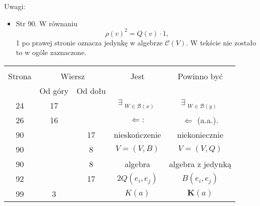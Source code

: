 Uwagi:
\begin{itemize}
\item Str 90. W równaniu
  \begin{displaymath}
    \rho( v )^{ 2 } = Q( v ) \cdot 1,
  \end{displaymath}
  1 po prawej stronie oznacza jedynkę w algebrze $\mathcal{C}( V )$. W
  tekście nie zostało to w ogóle zaznaczone.
\end{itemize}

\begin{center}
  \begin{tabular}{|c|c|c|c|c|}
    \hline
    & \multicolumn{2}{c|}{} & & \\
    Strona & \multicolumn{2}{c|}{Wiersz} & Jest
                              & Powinno być \\ \cline{2-3}
    & Od góry & Od dołu & & \\
    \hline
    24  & 17 & & $\exists_{ \substack{ W \in \mathcal{B}( x ) } }$
           & $\exists_{ \substack{ W \in \mathcal{B}( y ) } }$ \\
    26  & 16 & & $\Leftarrow:$ & $\Leftarrow$ (a.a.). \\
    90  & & 17 & nieskończenie & niekoniecznie \\
    90  & &  8 & $V = (V, B)$ & $V = (V, Q)$ \\
    90  & &  8 & algebra & algebra z jedynką \\
    92  & & 17 & $2Q( e_{ i }, e_{ j } )$ & $B( e_{ i }, e_{ j } )$ \\
    99  &  3 & & $K( a )$ & $\mathbf{K}( a )$ \\
    \hline
  \end{tabular}
\end{center}








